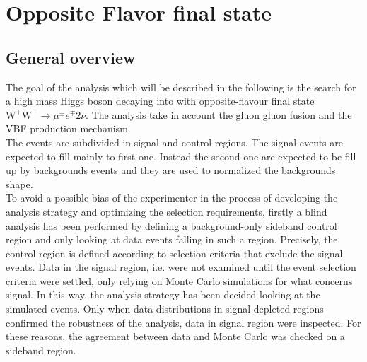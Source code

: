\newpage
\section{Opposite Flavor final state}\label{sec:OF}
\subsection*{General overview}
The goal of the analysis which will be described in the following is the search for a high mass Higgs boson decaying into \WW 
with  opposite-flavour final state $\mathrm{W^+W^-}\to \mu^{\pm} e^{\mp}  2\nu$.
The analysis take in account the gluon gluon fusion and the VBF production mechanism.\\
\newline
The events are subdivided in signal and control regions. The signal events are expected to fill  mainly to first one. Instead the second one are expected to be fill 
up by backgrounds events and they are used to normalized the backgrounds shape.\\
\newline
To avoid a possible bias of the experimenter in the process of developing the analysis
strategy and optimizing the selection requirements, firstly a blind analysis has been performed
by defining a background-only sideband control region and only looking at data events
falling in such a region. Precisely, the control region is defined according to  selection
criteria that exclude the signal events. 
Data in the signal region, i.e.  were not examined until the event selection
criteria were settled, only relying on Monte Carlo simulations for what concerns signal. 
In this way, the analysis strategy has been decided looking at the simulated events. 
Only when data distributions in signal-depleted regions confirmed the robustness of the analysis, data in
signal region were inspected. For these reasons, the agreement between data and Monte Carlo was
checked on a sideband region.




